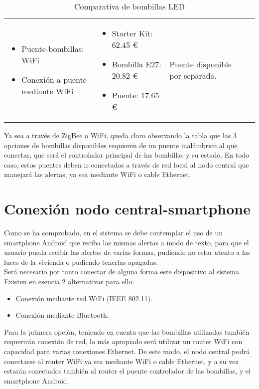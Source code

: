 \begin{table}[H]
{\begin{tabularx}{\textwidth}{p{2.35cm}|l|X|p{4.44cm}|p{3cm}}
\begin{itemize}[noitemsep,nosep,leftmargin=0.30cm]
                \item Puente-bombillas: WiFi
                \item Conexión a puente mediante WiFi
            \end{itemize} & \vspace{-2.8mm}\begin{itemize}[noitemsep,nosep,leftmargin=0.30cm]
                \item Starter Kit: 62.45 €~\cite{limitlessledstarterprice}
                \item Bombilla E27: 20.82 € \cite{limitlessledindividualprice}
                \item Puente: 17.65 €~\cite{limitlessledpuenteprice}
            \end{itemize} & Puente disponible por separado.
        \end{tabularx}
    }
    \caption{Comparativa de bombillas LED}
    \label{tab:bombillas}
\end{table}

Ya sea a través de ZigBee o WiFi, queda claro observando la tabla que las 3 opciones de bombillas disponibles requieren de un puente inalámbrico al que conectar, que será el controlador principal de las bombillas y su estado. En todo caso, estos puentes deben ir conectados a través de red local al nodo central que manejará las alertas, ya sea mediante WiFi o cable Ethernet.


\clearpage
\section{Conexión nodo central-smartphone}
Como se ha comprobado, en el sistema se debe contemplar el uso de un smartphone Android que reciba las mismas alertas a modo de texto, para que el usuario pueda recibir las alertas de varias formas, pudiendo no estar atento a las luces de la vivienda o pudiendo tenerlas apagadas.\\

Será necesario por tanto conectar de alguna forma este dispositivo al sistema. Existen en esencia 2 alternativas para ello:

\begin{itemize}
    \item Conexión mediante red WiFi (IEEE 802.11).
    \item Conexión mediante Bluetooth.
\end{itemize}

Para la primera opción, teniendo en cuenta que las bombillas utilizadas también requerirán conexión de red, lo más apropiado será utilizar un router WiFi con capacidad para varias conexiones Ethernet. De este modo, el nodo central podrá conectarse al router WiFi ya sea mediante WiFi o cable Ethernet, y a su vez estarán conectados también al router el puente controlador de las bombillas, y el smartphone Android.\\

